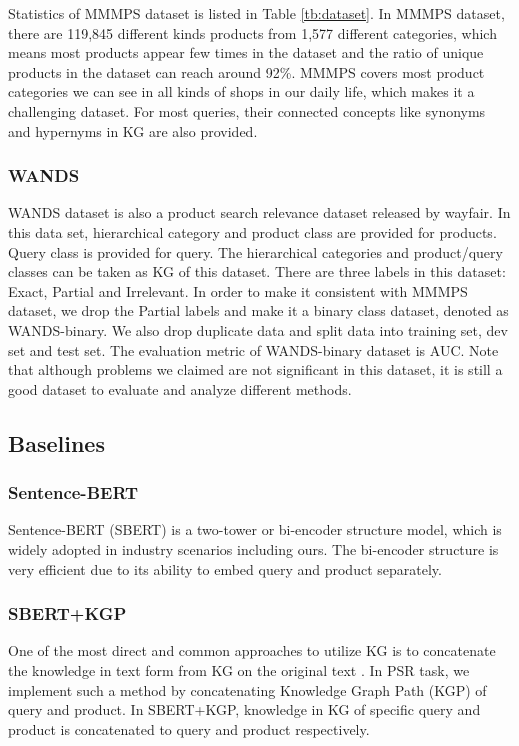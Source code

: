 Statistics of MMMPS dataset is listed in Table \ref{tb:dataset}. In MMMPS dataset, there are 119,845 different kinds products from 1,577 different categories, which means most products appear few times in the dataset and the ratio of unique products in the dataset can reach around 92\%. MMMPS covers most product categories we can see in all kinds of shops in our daily life, which makes it a challenging dataset. For most queries, their connected concepts like synonyms and hypernyms in KG are also provided.

\subsubsection{WANDS}

WANDS dataset \cite{chen2022wands} is also a product search relevance dataset released by wayfair. In this data set, hierarchical category and product class are provided for products. Query class is provided for query. The hierarchical categories and product/query classes can be taken as KG of this dataset. There are three labels in this dataset: Exact, Partial and Irrelevant. In order to make it consistent with MMMPS dataset, we drop the Partial labels and make it a binary class dataset, denoted as WANDS-binary. We also drop duplicate data and split data into training set, dev set and test set. The evaluation metric of WANDS-binary dataset is AUC. Note that although problems we claimed are not significant in this dataset, it is still a good dataset to evaluate and analyze different methods.

\subsection{Baselines}
\subsubsection{Sentence-BERT}
Sentence-BERT (SBERT) \cite{reimers2019sentence} is a two-tower or bi-encoder structure model, which is widely adopted in industry scenarios including ours. The bi-encoder structure is very efficient due to its ability to embed query and product separately.

\subsubsection{SBERT+KGP}
One of the most direct and common approaches to utilize KG is to concatenate the knowledge in text form from KG on the original text \cite{bian2021benchmarking, weijie2019kbert}. In PSR task, we implement such a method by concatenating Knowledge Graph Path (KGP) of query and product. In SBERT+KGP, knowledge in KG of specific query and product is concatenated to query and product respectively.

